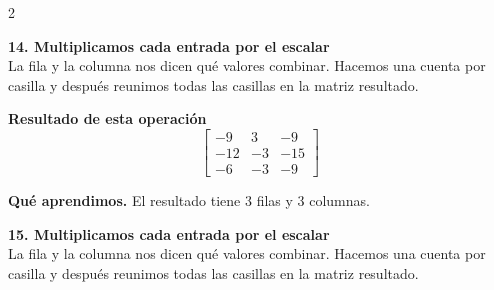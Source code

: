 \documentclass[11pt,a4paper,landscape]{article}
\begin{document}
\begin{multicols*}{2}
\noindent\begin{minipage}{\linewidth}\textbf{14. Multiplicamos cada entrada por el escalar}\\[2pt]La fila y la columna nos dicen qué valores combinar. Hacemos una cuenta por casilla y después reunimos todas las casillas en la matriz resultado.
\par{}\par\smallskip
\par\smallskip \textbf{Resultado de esta operación}\[\begin{bmatrix}-9 & 3 & -9\\-12 & -3 & -15\\-6 & -3 & -9\end{bmatrix}\]
\par\smallskip\textbf{Qué aprendimos.} El resultado tiene 3 filas y 3 columnas.
\end{minipage}\par\medskip
\noindent\begin{minipage}{\linewidth}\textbf{15. Multiplicamos cada entrada por el escalar}\\[2pt]La fila y la columna nos dicen qué valores combinar. Hacemos una cuenta por casilla y después reunimos todas las casillas en la matriz resultado.

\end{minipage}
\end{multicols*}
\end{document}
